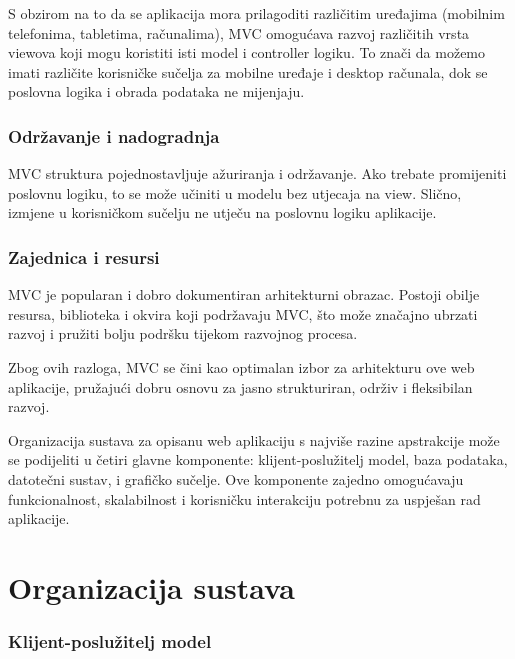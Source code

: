 S obzirom na to da se aplikacija mora prilagoditi različitim uređajima (mobilnim telefonima, tabletima, računalima), MVC omogućava razvoj različitih vrsta viewova koji mogu koristiti isti model i controller logiku. To znači da možemo imati različite korisničke sučelja za mobilne uređaje i desktop računala, dok se poslovna logika i obrada podataka ne mijenjaju.
	\\

 \subsubsection{Održavanje i nadogradnja}

MVC struktura pojednostavljuje ažuriranja i održavanje. Ako trebate promijeniti poslovnu logiku, to se može učiniti u modelu bez utjecaja na view. Slično, izmjene u korisničkom sučelju ne utječu na poslovnu logiku aplikacije.
	\\
	
 \subsubsection{Zajednica i resursi}

MVC je popularan i dobro dokumentiran arhitekturni obrazac. Postoji obilje resursa, biblioteka i okvira koji podržavaju MVC, što može značajno ubrzati razvoj i pružiti bolju podršku tijekom razvojnog procesa.

Zbog ovih razloga, MVC se čini kao optimalan izbor za arhitekturu ove web aplikacije, pružajući dobru osnovu za jasno strukturiran, održiv i fleksibilan razvoj.


Organizacija sustava za opisanu web aplikaciju s najviše razine apstrakcije može se podijeliti u četiri glavne komponente: klijent-poslužitelj model, baza podataka, datotečni sustav, i grafičko sučelje. Ove komponente zajedno omogućavaju funkcionalnost, skalabilnost i korisničku interakciju potrebnu za uspješan rad aplikacije.

	\eject
	
	\section{Organizacija sustava}

 \subsubsection{Klijent-poslužitelj model}

